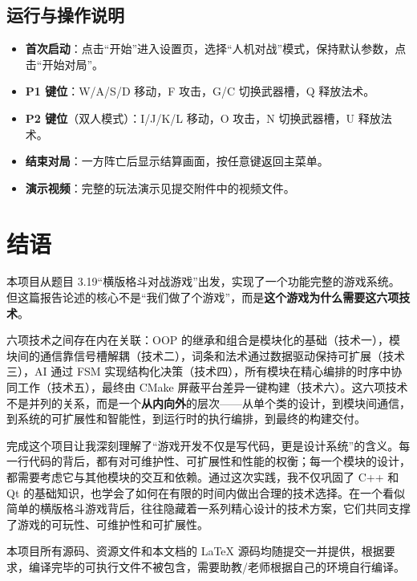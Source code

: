 \documentclass[utf8]{ctexart}
\begin{document}
\subsection{运行与操作说明}

\begin{itemize}
  \item \textbf{首次启动}：点击“开始”进入设置页，选择“人机对战”模式，保持默认参数，点击“开始对局”。
  \item \textbf{P1 键位}：W/A/S/D 移动，F 攻击，G/C 切换武器槽，Q 释放法术。
  \item \textbf{P2 键位}（双人模式）：I/J/K/L 移动，O 攻击，N 切换武器槽，U 释放法术。
  \item \textbf{结束对局}：一方阵亡后显示结算画面，按任意键返回主菜单。
  \item \textbf{演示视频}：完整的玩法演示见提交附件中的视频文件。
\end{itemize}

\section*{结语}

本项目从题目 3.19“横版格斗对战游戏”出发，实现了一个功能完整的游戏系统。但这篇报告论述的核心不是“我们做了个游戏”，而是\textbf{这个游戏为什么需要这六项技术}。

六项技术之间存在内在关联：OOP 的继承和组合是模块化的基础（技术一），模块间的通信靠信号槽解耦（技术二），词条和法术通过数据驱动保持可扩展（技术三），AI 通过 FSM 实现结构化决策（技术四），所有模块在精心编排的时序中协同工作（技术五），最终由 CMake 屏蔽平台差异一键构建（技术六）。这六项技术不是并列的关系，而是一个\textbf{从内向外}的层次——从单个类的设计，到模块间通信，到系统的可扩展性和智能性，到运行时的执行编排，到最终的构建交付。

完成这个项目让我深刻理解了“游戏开发不仅是写代码，更是设计系统”的含义。每一行代码的背后，都有对可维护性、可扩展性和性能的权衡；每一个模块的设计，都需要考虑它与其他模块的交互和依赖。通过这次实践，我不仅巩固了 C++ 和 Qt 的基础知识，也学会了如何在有限的时间内做出合理的技术选择。在一个看似简单的横版格斗游戏背后，往往隐藏着一系列精心设计的技术方案，它们共同支撑了游戏的可玩性、可维护性和可扩展性。

\vspace{1em}
\noindent 本项目所有源码、资源文件和本文档的 LaTeX 源码均随提交一并提供，根据要求，编译完毕的可执行文件不被包含，需要助教/老师根据自己的环境自行编译。
\end{document}
